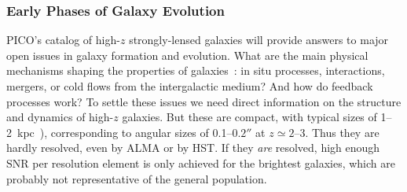 \documentclass[PICOReport.tex]{subfiles}
\begin{document}

\subsubsection{Early Phases of Galaxy Evolution}


PICO's catalog of high-$z$ strongly-lensed galaxies will provide answers to major open issues in galaxy formation and evolution. What are the main physical mechanisms shaping the properties of galaxies~\citep{SilkMamon2012, SomervilleDave2015}: in situ processes, interactions, mergers, or cold flows  from the intergalactic medium? And how do feedback processes work? To settle these issues we need direct information on the structure and dynamics of high-$z$ galaxies. But these are compact, with typical sizes of 1--2~kpc~\cite{Fujimoto2018}), corresponding to angular sizes of 0.1--$0.2''$ at $z\simeq 2$--3. Thus they are hardly resolved, even by ALMA or by HST. If they {\it are} resolved, high enough \ac{SNR} per resolution element is only achieved for the brightest galaxies, which are probably not representative of the general population.
\end{document}
